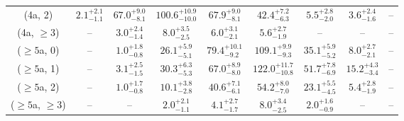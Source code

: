 \begin{table}[h!]
{\begin{tabular}{ccccccccc}
	(4a, 2) & $2.1^{+ 2.1 }_{- 1.1 }$ & $67.0^{+ 9.0 }_{- 8.1 }$ & $100.6^{+ 10.9 }_{- 10.0 }$ & $67.9^{+ 9.0 }_{- 8.1 }$ & $42.4^{+ 7.2 }_{- 6.3 }$ & $5.5^{+ 2.8 }_{- 2.0 }$ & $3.6^{+ 2.4 }_{- 1.6 }$ & -- \\[0.5ex] 
	(4a, $\ge3$) & -- & $3.0^{+ 2.4 }_{- 1.4 }$ & $8.0^{+ 3.5 }_{- 2.5 }$ & $6.0^{+ 3.1 }_{- 2.1 }$ & $5.6^{+ 2.7 }_{- 1.9 }$ & -- & -- & -- \\[0.5ex] 
	($\ge5$a, 0) & -- & $1.0^{+ 1.8 }_{- 0.8 }$ & $26.1^{+ 5.9 }_{- 5.1 }$ & $79.4^{+ 10.1 }_{- 9.2 }$ & $109.1^{+ 9.9 }_{- 9.3 }$ & $35.1^{+ 5.9 }_{- 5.2 }$ & $8.0^{+ 2.7 }_{- 2.1 }$ & -- \\[0.5ex] 
	($\ge5$a, 1) & -- & $3.1^{+ 2.5 }_{- 1.5 }$ & $30.3^{+ 6.3 }_{- 5.3 }$ & $67.0^{+ 8.9 }_{- 8.0 }$ & $122.0^{+ 11.7 }_{- 10.8 }$ & $51.7^{+ 7.8 }_{- 6.9 }$ & $15.2^{+ 4.3 }_{- 3.4 }$ & -- \\[0.5ex] 
	($\ge5$a, 2) & -- & $1.0^{+ 1.7 }_{- 0.8 }$ & $10.1^{+ 3.8 }_{- 2.8 }$ & $40.6^{+ 7.1 }_{- 6.1 }$ & $54.2^{+ 8.0 }_{- 7.0 }$ & $23.1^{+ 5.5 }_{- 4.5 }$ & $5.4^{+ 2.8 }_{- 1.9 }$ & -- \\[0.5ex] 
	($\ge5$a, $\ge3$) & -- & -- & $2.0^{+ 2.1 }_{- 1.1 }$ & $4.1^{+ 2.7 }_{- 1.7 }$ & $8.0^{+ 3.4 }_{- 2.5 }$ & $2.0^{+ 1.6 }_{- 0.9 }$ & -- & -- \\[0.5ex] 
	\hline
	\hline
\end{tabular}}
\end{table}
